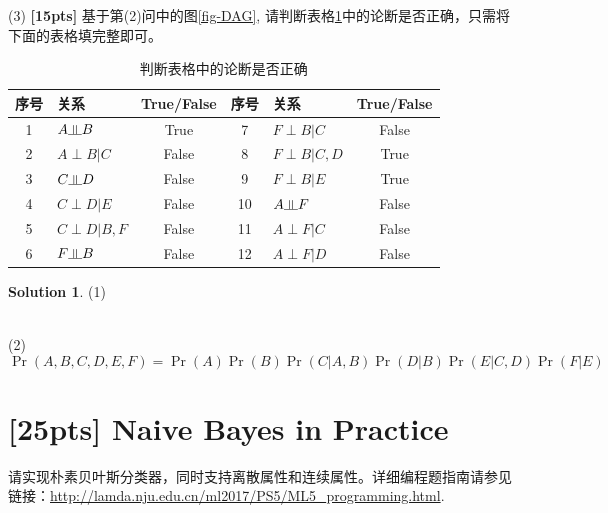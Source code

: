 \documentclass[a4paper,UTF8]{article}
\numberwithin{equation}{section}
\theoremstyle{definition}
\newtheorem*{solution}{Solution}
\newcommand{\indep}{\rotatebox[origin=c]{90}{$\models$}}
\begin{document}
(3) \textbf{[15pts]} 基于第(2)问中的图\ref{fig-DAG}, 请判断表格\ref{table:DAG}中的论断是否正确，只需将下面的表格填完整即可。
\begin{table}[h]
\centering
\caption{判断表格中的论断是否正确}
\label{table:DAG}
\begin{tabular}{c|l|c||c|l|c}\hline
序号   		& 		关系  		& True/False 	& 序号   	& 		关系  		& True/False \\ \hline
1			&	$A \indep B$ 		& 	True	    		& 7  		& 	$F \perp B|C$ 		& 	False		 \\
2			&	$A \perp B|C$ 	    	& 	False	    	& 8  		& 	$F \perp B|C, D$ 	& 	True		 \\
3			&	$C \indep D $		& 	False    		& 9  		& 	$F \perp B|E$ 		& 	True		 \\
4			&	$C \perp D|E$ 	& 	False	    	& 10  	& 	$A \indep F $		& 	False		 \\
5			&	$C \perp D|B, F$     	& 	False	    	& 11  	& 	$A \perp F|C$ 		& 	False		 \\
6			&	$F \indep B $		&  	False	    	& 12  	& 	$A \perp F|D$ 		& 	False		 \\ \hline
\end{tabular}
\end{table}

\begin{solution}
(1) \\
 \\
(2) 
\begin{equation*}
\Pr(A, B, C, D, E, F) = \Pr(A)\Pr(B)\Pr(C|A, B)\Pr(D|B)\Pr(E|C, D)\Pr(F|E)
\end{equation*}

\end{solution}


\section{[25pts] Naive Bayes in Practice}
请实现朴素贝叶斯分类器，同时支持离散属性和连续属性。详细编程题指南请参见链接：\url{http://lamda.nju.edu.cn/ml2017/PS5/ML5_programming.html}. 
\end{document}
